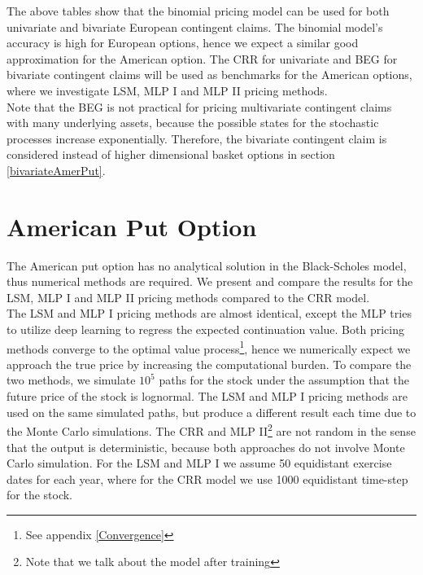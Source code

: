 The above tables show that the binomial pricing model can be used for both univariate and bivariate European contingent claims. The binomial model's accuracy is high for European options, hence we expect a similar good approximation for the American option. The CRR for univariate and BEG for bivariate contingent claims will be used as benchmarks for the American options, where we investigate LSM, MLP I and MLP II pricing methods. \\

Note that the BEG is not practical for pricing multivariate contingent claims with many underlying assets, because the possible states for the stochastic processes increase exponentially. Therefore, the bivariate contingent claim is considered instead of higher dimensional basket options in section \ref{bivariateAmerPut}.
\section{American Put Option}
The American put option has no analytical solution in the Black-Scholes model, thus numerical methods are required. We present and compare the results for the LSM, MLP I and MLP II pricing methods compared to the CRR model.\\

The LSM and MLP I pricing methods are almost identical, except the MLP tries to utilize deep learning to regress the expected continuation value. Both pricing methods converge to the optimal value process\footnote{See appendix \ref{Convergence}}, hence we numerically expect we approach the true price by increasing the computational burden. To compare the two methods, we simulate $10^5$ paths for the stock under the assumption that the future price of the stock is lognormal. The LSM and MLP I pricing methods are used on the same simulated paths, but produce a different result each time due to the Monte Carlo simulations. The CRR and MLP II\footnote{Note that we talk about the model after training} are not random in the sense that the output is deterministic, because both approaches do not involve Monte Carlo simulation. For the LSM and MLP I we assume 50 equidistant exercise dates for each year, where for the CRR model we use 1000 equidistant time-step for the stock.  \\

